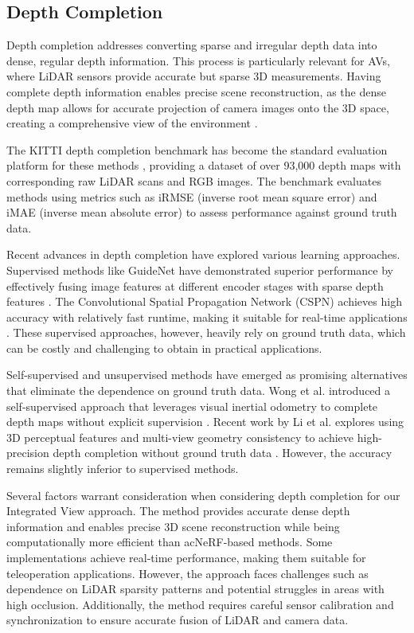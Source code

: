 \subsection{Depth Completion}

Depth completion addresses converting sparse and irregular depth data into dense, regular depth information. This process is particularly relevant for \acp{AV}, where LiDAR sensors provide accurate but sparse 3D measurements. Having complete depth information enables precise scene reconstruction, as the dense depth map allows for accurate projection of camera images onto the 3D space, creating a comprehensive view of the environment \cite{tang2023comprehensive}.

The KITTI depth completion benchmark has become the standard evaluation platform for these methods \cite{uhrig2017sparsity}, providing a dataset of over 93,000 depth maps with corresponding raw LiDAR scans and RGB images. The benchmark evaluates methods using metrics such as iRMSE (inverse root mean square error) and iMAE (inverse mean absolute error) to assess performance against ground truth data.

Recent advances in depth completion have explored various learning approaches. Supervised methods like GuideNet have demonstrated superior performance by effectively fusing image features at different encoder stages with sparse depth features \cite{tang2023guidenet}. The Convolutional Spatial Propagation Network (CSPN) achieves high accuracy with relatively fast runtime, making it suitable for real-time applications \cite{cheng2020cspn}. These supervised approaches, however, heavily rely on ground truth data, which can be costly and challenging to obtain in practical applications.

Self-supervised and unsupervised methods have emerged as promising alternatives that eliminate the dependence on ground truth data. Wong et al. introduced a self-supervised approach that leverages visual inertial odometry to complete depth maps without explicit supervision \cite{wong2020unsupervised}. Recent work by Li et al. explores using 3D perceptual features and multi-view geometry consistency to achieve high-precision depth completion without ground truth data \cite{li2023self}. However, the accuracy remains slightly inferior to supervised methods.

Several factors warrant consideration when considering depth completion for our Integrated View approach. The method provides accurate dense depth information and enables precise 3D scene reconstruction while being computationally more efficient than ac{NeRF}-based methods. Some implementations achieve real-time performance, making them suitable for teleoperation applications. However, the approach faces challenges such as dependence on LiDAR sparsity patterns and potential struggles in areas with high occlusion. Additionally, the method requires careful sensor calibration and synchronization to ensure accurate fusion of LiDAR and camera data.

